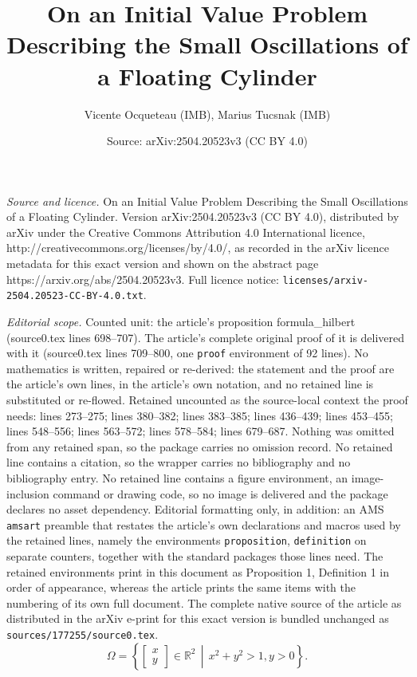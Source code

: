 \documentclass[10pt,a4paper]{amsart}
\title{On an Initial Value Problem Describing the Small Oscillations of a Floating Cylinder}
\author{Vicente Ocqueteau (IMB), Marius Tucsnak (IMB)}
\date{Source: arXiv:2504.20523v3 (CC BY 4.0)}
\begin{document}
\maketitle

\noindent\emph{Source and licence.} On an Initial Value Problem Describing the Small Oscillations of a Floating Cylinder. Version arXiv:2504.20523v3 (CC BY 4.0), distributed by arXiv under the Creative Commons Attribution 4.0 International licence, http://creativecommons.org/licenses/by/4.0/, as recorded in the arXiv licence metadata for this exact version and shown on the abstract page https://arxiv.org/abs/2504.20523v3. Full licence notice: \texttt{licenses/arxiv-2504.20523-CC-BY-4.0.txt}.\par\smallskip

\noindent\textit{Editorial scope.} Counted unit: the article's proposition formula\_hilbert (source0.tex lines 698--707). The article's complete original proof of it is delivered with it (source0.tex lines 709--800, one \texttt{proof} environment of 92 lines). No mathematics is written, repaired or re-derived: the statement and the proof are the article's own lines, in the article's own notation, and no retained line is substituted or re-flowed.  Retained uncounted as the source-local context the proof needs: lines 273--275; lines 380--382; lines 383--385; lines 436--439; lines 453--455; lines 548--556; lines 563--572; lines 578--584; lines 679--687.  Nothing was omitted from any retained span, so the package carries no omission record.  No retained line contains a citation, so the wrapper carries no bibliography and no bibliography entry.  No retained line contains a figure environment, an image-inclusion command or drawing code, so no image is delivered and the package declares no asset dependency.  Editorial formatting only, in addition: an AMS \texttt{amsart} preamble that restates the article's own declarations and macros used by the retained lines, namely the environments \texttt{proposition}, \texttt{definition} on separate counters, together with the standard packages those lines need.  The retained environments print in this document as Proposition 1, Definition 1 in order of appearance, whereas the article prints the same items with the numbering of its own full document.  The complete native source of the article as distributed in the arXiv e-print for this exact version is bundled unchanged as \texttt{sources/177255/source0.tex}.
\begin{equation}\label{Omega}
    \Omega=\left\{\left.\begin{bmatrix} x\\ y\end{bmatrix}\in \mathbb{R}^2\ \ \right|\ \ x^2+y^2>1,y>0\right\}.
\end{equation}
\end{document}
